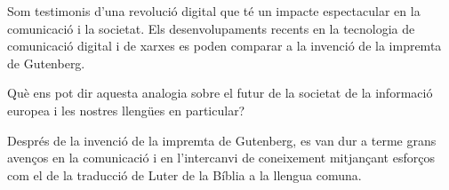 \clearpage



\begin{multicols}{2}

Som testimonis d’una revolució digital que té un impacte espectacular en la comunicació i la societat. Els desenvolupaments recents en la tecnologia de comunicació digital i de xarxes es poden comparar a la invenció de la impremta de Gutenberg.

Què ens pot dir aquesta analogia sobre el futur de la societat de la informació europea i les nostres llengües en particular?

Després de la invenció de la impremta de Gutenberg, es van dur a terme grans avenços en la comunicació i en l’intercanvi de coneixement mitjançant esforços com el de la traducció de Luter de la Bíblia a la llengua comuna.


\end{multicols}
